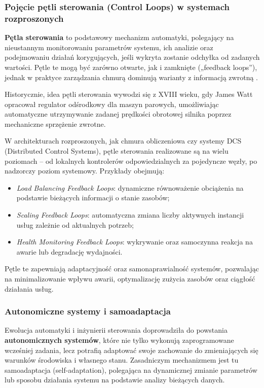 \subsubsection{Pojęcie pętli sterowania (Control Loops) w systemach rozproszonych}

\textbf{Pętla sterowania} to podstawowy mechanizm automatyki, polegający na nieustannym monitorowaniu parametrów systemu, ich analizie oraz podejmowaniu działań korygujących, jeśli wykryta zostanie odchyłka od zadanych wartości. Pętle te mogą być zarówno otwarte, jak i zamknięte („feedback loops”), jednak w praktyce zarządzania chmurą dominują warianty z informacją zwrotną .

Historycznie, idea pętli sterowania wywodzi się z XVIII wieku, gdy James Watt opracował regulator odśrodkowy dla maszyn parowych, umożliwiając automatyczne utrzymywanie zadanej prędkości obrotowej silnika poprzez mechaniczne sprzężenie zwrotne.


W architekturach rozproszonych, jak chmura obliczeniowa czy systemy DCS (Distributed Control Systems), pętle sterowania realizowane są na wielu poziomach – od lokalnych kontrolerów odpowiedzialnych za pojedyncze węzły, po nadzorczy poziom systemowy. Przykłady obejmują:

\begin{itemize}
    \item \textit{Load Balancing Feedback Loops}: dynamiczne równoważenie obciążenia na podstawie bieżących informacji o stanie zasobów;
    \item \textit{Scaling Feedback Loops}: automatyczna zmiana liczby aktywnych instancji usług zależnie od aktualnych potrzeb;
    \item \textit{Health Monitoring Feedback Loops}: wykrywanie oraz samoczynna reakcja na awarie lub degradację wydajności.
\end{itemize}

Pętle te zapewniają adaptacyjność oraz samonaprawialność systemów, pozwalając na minimalizowanie wpływu awarii, optymalizację zużycia zasobów oraz ciągłość działania usług.

\subsubsection{Autonomiczne systemy i samoadaptacja}
Ewolucja automatyki i inżynierii sterowania doprowadziła do powstania \textbf{autonomicznych systemów}, które nie tylko wykonują zaprogramowane wcześniej zadania, lecz potrafią adaptować swoje zachowanie do zmieniających się warunków środowiska i własnego stanu. Zasadniczym mechanizmem jest tu samoadaptacja (self-adaptation), polegająca na dynamicznej zmianie parametrów lub sposobu działania systemu na podstawie analizy bieżących danych.

